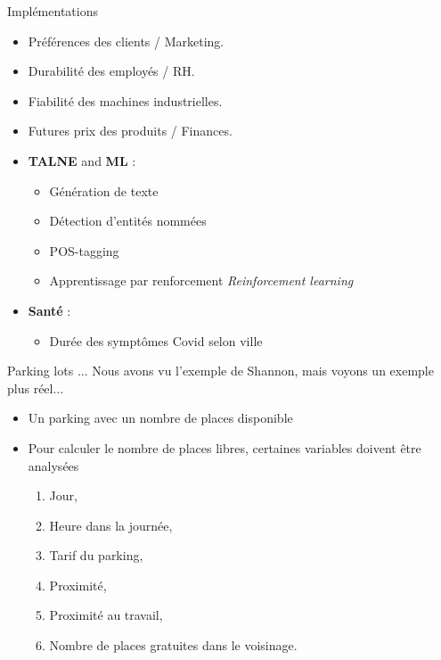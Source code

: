 \documentclass[aspectratio=169,xcolor=dvipsnames, t]{beamer}
\begin{document}
\begin{frame}{Implémentations}
	
	\begin{itemize}
		\item Préférences des clients / Marketing.
		\item Durabilité des employés / RH.
		\item Fiabilité des machines industrielles.
		\item Futures prix des produits / Finances.
		\item \textbf{TALNE} and \textbf{ML} :
		\begin{itemize}
			\item Génération de texte
			\item Détection d'entités nommées
			\item POS-tagging
			\item Apprentissage par renforcement \textit{Reinforcement learning}
		\end{itemize}
		
		\item \textbf{Santé} :
		\begin{itemize}
			\item Durée des symptômes Covid selon ville
		\end{itemize}
		
	\end{itemize}
	
\end{frame}


\begin{frame}{Parking lots ...}
	Nous avons vu l'exemple de Shannon, mais voyons un exemple plus réel...
	\begin{itemize}
		\item Un parking avec un nombre de places disponible
		\item Pour calculer le nombre de places libres, certaines variables doivent être analysées
		\begin{enumerate}
			\item Jour,
			\item Heure dans la journée,
			\item Tarif du parking,
			\item Proximité,
			\item Proximité au travail,
			\item Nombre de places gratuites dans le voisinage.
		\end{enumerate}
	\end{itemize}
\end{frame}
\end{document}
